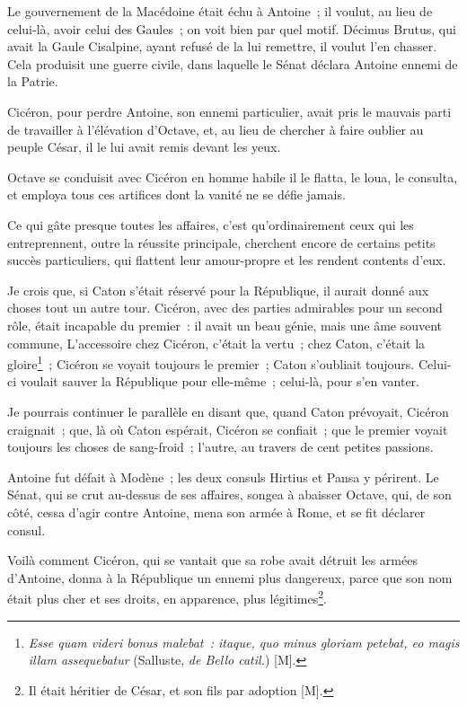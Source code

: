 \documentclass[french,twoside]{book} %
\begin{document}
Le gouvernement de la Macédoine était échu à Antoine ; il voulut, au lieu de celui-là, avoir celui des Gaules ; on voit bien par quel motif. Décimus Brutus, qui avait la Gaule Cisalpine, ayant refusé de la lui remettre, il voulut l’en chasser. Cela produisit une guerre civile, dans laquelle le Sénat déclara Antoine ennemi de la Patrie.\par
Cicéron, pour perdre Antoine, son ennemi particulier, avait pris le mauvais parti de travailler à l’élévation d’Octave, et, au lieu de chercher à faire oublier au peuple César, il le lui avait remis devant les yeux.\par
Octave se conduisit avec Cicéron en homme habile il le flatta, le loua, le consulta, et employa tous ces artifices dont la vanité ne se défie jamais.\par
Ce qui gâte presque toutes les affaires, c’est qu’ordinairement ceux qui les entreprennent, outre la réussite principale, cherchent encore de certains petits succès particuliers, qui flattent leur amour-propre et les rendent contents d’eux.\par
Je crois que, si Caton s’était réservé pour la République, il aurait donné aux choses tout un autre tour. Cicéron, avec des parties admirables pour un second rôle, était incapable du premier : il avait un beau génie, mais une âme souvent commune, L’accessoire chez Cicéron, c’était la vertu ; chez Caton, c’était la gloire\footnote{{\itshape Esse quam videri bonus malebat : itaque, quo minus gloriam petebat, eo magis illam assequebatur} (Salluste, {\itshape de Bello catil.}) [M].} ; Cicéron se voyait toujours le premier ; Caton s’oubliait toujours. Celui-ci voulait sauver la République pour elle-même ; celui-là, pour s’en vanter.\par
Je pourrais continuer le parallèle en disant que, quand Caton prévoyait, Cicéron craignait ; que, là où Caton espérait, Cicéron se confiait ; que le premier voyait toujours les choses de sang-froid ; l’autre, au travers de cent petites passions.\par
Antoine fut défait à Modène ; les deux consuls Hirtius et Pansa y périrent. Le Sénat, qui se crut au-dessus de ses affaires, songea à abaisser Octave, qui, de son côté, cessa d’agir contre Antoine, mena son armée à Rome, et se fit déclarer consul.\par
Voilà comment Cicéron, qui se vantait que sa robe avait détruit les armées d’Antoine, donna à la République un ennemi plus dangereux, parce que son nom était plus cher et ses droits, en apparence, plus légitimes\footnote{Il était héritier de César, et son fils par adoption [M].}.\par
\end{document}
